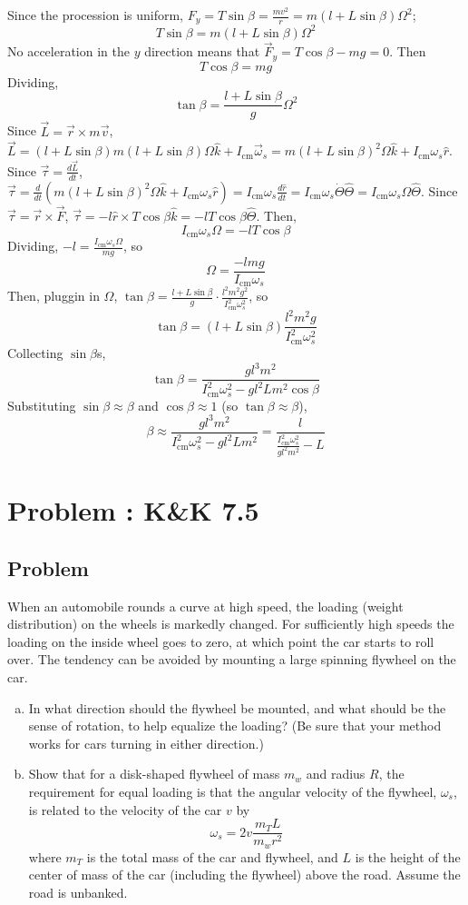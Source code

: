 \documentclass[solutions]{esg8012pset}
\begin{document}
Since the procession is uniform, $F_y = T\sin\beta = \frac{m v^2}{r} = m (l + L\sin\beta) \Omega^2$; $$T\sin\beta = m(l + L\sin\beta)\Omega^2$$
No acceleration in the $y$ direction means that $\vec F_y = T\cos\beta - mg = 0$.  Then $$T\cos\beta = m g$$
Dividing, $$\tan\beta = \frac{l + L\sin\beta}{g} \Omega^2$$
Since $\vec L = \vec r\times m \vec v$, $\vec L = (l + L\sin\beta)m(l + L\sin\beta)\Omega \hat k + I_\text{cm}\vec \omega_s = m(l + L\sin\beta)^2\Omega \hat k + I_\text{cm}\omega_s \hat r$.
Since $\vec \tau = \frac{d \vec L}{d t}$, $\vec \tau = \frac{d}{d t}\left(m(l + L\sin\beta)^2\Omega \hat k + I_\text{cm}\omega_s \hat r\right) = I_\text{cm}\omega_s \frac{d \hat r}{d t} = I_\text{cm}\omega_s \dot\Theta \hat\Theta = I_\text{cm}\omega_s \Omega \hat\Theta$.
Since $\vec \tau = \vec r\times \vec F$, $\vec \tau = -l\hat r \times T\cos\beta \hat k = -l T\cos\beta \hat\Theta$.
Then, $$I_\text{cm}\omega_s \Omega = -l T\cos\beta$$
Dividing, $-l = \frac{I_\text{cm}\omega_s \Omega}{m g}$, so $$\Omega = \frac{-l m g}{I_\text{cm}\omega_s}$$
Then, pluggin in $\Omega$, $\tan\beta = \frac{l + L\sin\beta}{g} \cdot \frac{l^2 m^2 g^2}{I_\text{cm}^2\omega_s^2}$, so $$\tan\beta = (l + L\sin\beta)\frac{l^2 m^2 g}{I_\text{cm}^2 \omega_s^2}$$
Collecting $\sin\beta$s, $$\tan\beta = \frac{g l^3 m^2}{I_\text{cm}^2 \omega_s^2 - g l^2 L m^2\cos\beta}$$
Substituting $\sin\beta \approx \beta$ and $\cos\beta\approx 1$ (so $\tan\beta\approx \beta$), $$\beta \approx \frac{g l^3 m^2}{I_\text{cm}^2 \omega_s^2 - g l^2 L m^2} = \frac{l}{\frac{I_\text{cm}^2 \omega_s^2}{g l^2 m^2} - L}$$
\section{Problem \thesection: K\&K 7.5}
\subsection{Problem}
  When an automobile rounds a curve at high speed, the loading (weight distribution) on the wheels is markedly changed. For sufficiently high speeds the loading on the inside wheel goes to zero, at which point the car starts to roll over. The tendency can be avoided by mounting a large spinning flywheel on the car.
  \begin{enumerate}[(a)]
    \item In what direction should the flywheel be mounted, and what should be the sense of rotation, to help equalize the loading? (Be sure that your method works for cars turning in either direction.)
    \item Show that for a disk-shaped flywheel of mass $m_w$ and radius $R$, the requirement for equal loading is that the angular velocity of the flywheel, $\omega_s$, is related to the velocity of the car $v$ by $$\omega_s = 2v\frac{m_T L}{m_w r^2}$$ where $m_T$ is the total mass of the car and flywheel, and $L$ is the height of the center of mass of the car (including the flywheel) above the road. Assume the road is unbanked.
  \end{enumerate}
\end{document}
